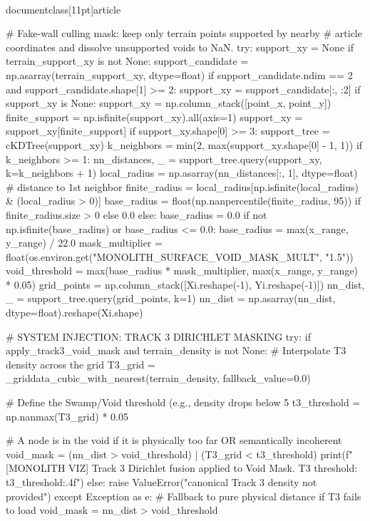 \\documentclass[11pt]{article}
\begin{document}
\begin{CodeBlock}
    # Fake-wall culling mask: keep only terrain points supported by nearby
    # article coordinates and dissolve unsupported voids to NaN.
    try:
        support_xy = None
        if terrain_support_xy is not None:
            support_candidate = np.asarray(terrain_support_xy, dtype=float)
            if support_candidate.ndim == 2 and support_candidate.shape[1] >= 2:
                support_xy = support_candidate[:, :2]
        if support_xy is None:
            support_xy = np.column_stack([point_x, point_y])
        finite_support = np.isfinite(support_xy).all(axis=1)
        support_xy = support_xy[finite_support]
        if support_xy.shape[0] >= 3:
            support_tree = cKDTree(support_xy)
            k_neighbors = min(2, max(support_xy.shape[0] - 1, 1))
            if k_neighbors >= 1:
                nn_distances, _ = support_tree.query(support_xy, k=k_neighbors + 1)
                local_radius = np.asarray(nn_distances[:, 1], dtype=float) # distance to 1st neighbor
                finite_radius = local_radius[np.isfinite(local_radius) & (local_radius > 0)]
                base_radius = float(np.nanpercentile(finite_radius, 95)) if finite_radius.size > 0 else 0.0
            else:
                base_radius = 0.0
            if not np.isfinite(base_radius) or base_radius <= 0.0:
                base_radius = max(x_range, y_range) / 22.0
            mask_multiplier = float(os.environ.get("MONOLITH_SURFACE_VOID_MASK_MULT", "1.5"))
            void_threshold = max(base_radius * mask_multiplier, max(x_range, y_range) * 0.05)
            grid_points = np.column_stack([Xi.reshape(-1), Yi.reshape(-1)])
            nn_dist, _ = support_tree.query(grid_points, k=1)
            nn_dist = np.asarray(nn_dist, dtype=float).reshape(Xi.shape)
            
            # SYSTEM INJECTION: TRACK 3 DIRICHLET MASKING
            try:
                if apply_track3_void_mask and terrain_density is not None:
                    # Interpolate T3 density across the grid
                    T3_grid = _griddata_cubic_with_nearest(terrain_density, fallback_value=0.0)
                    
                    # Define the Swamp/Void threshold (e.g., density drops below 5%
                    t3_threshold = np.nanmax(T3_grid) * 0.05
                    
                    # A node is in the void if it is physically too far OR semantically incoherent
                    void_mask = (nn_dist > void_threshold) | (T3_grid < t3_threshold)
                    print(f"[MONOLITH VIZ] Track 3 Dirichlet fusion applied to Void Mask. T3 threshold: {t3_threshold:.4f}")
                else:
                    raise ValueError("canonical Track 3 density not provided")
            except Exception as e:
                # Fallback to pure physical distance if T3 fails to load
                void_mask = nn_dist > void_threshold
                

\end{CodeBlock}
\end{document}
